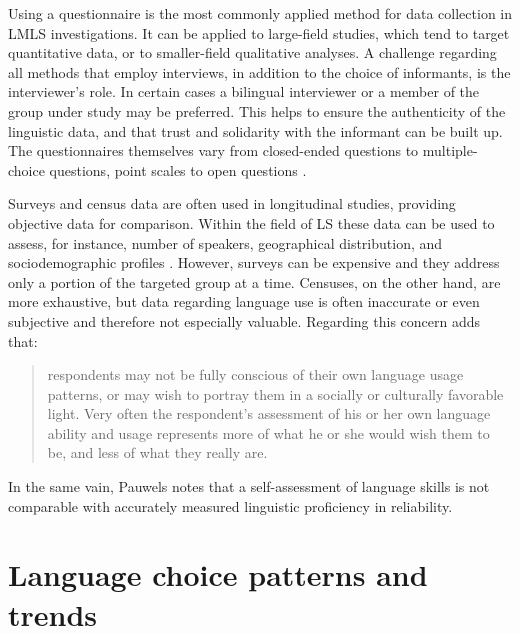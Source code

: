 \documentclass[output=paper,
modfonts
]{langscibook}
\begin{document}
Using a questionnaire is the most commonly applied method for data collection in LMLS investigations. It can be applied to large-field studies, which tend to target quantitative data, or to smaller-field qualitative analyses. A challenge regarding all methods that employ interviews, in addition to the choice of informants, is the interviewer's role. In certain cases a bilingual interviewer or a member of the group under study may be preferred. This helps to ensure the authenticity of the linguistic data, and that trust and solidarity with the informant can be built up. The questionnaires themselves vary from closed-ended questions to multiple-choice questions, point scales to open questions \parencite[53-61]{Pauwels2016}. 

Surveys and census data are often used in longitudinal studies, providing objective data for comparison. Within the field of LS these data can be used to assess, for instance, number of speakers, geographical distribution, and sociodemographic profiles \parencite{Clyne1991}. However, surveys can be expensive and they address only a portion of the targeted group at a time. Censuses, on the other hand, are more exhaustive, but data regarding language use is often inaccurate or even subjective and therefore not especially valuable. Regarding this concern \cite[para. 16]{Buda1992} adds that:

\begin{quote}
respondents may not be fully conscious of their own language usage patterns, or may wish to portray them in a socially or culturally favorable light. Very often the respondent's assessment of his or her own language ability and usage represents more of what he or she would wish them to be, and less of what they really are.
\end{quote}

In the same vain, Pauwels \parencite*[66]{Pauwels2016} notes that a self-assessment of language skills is not comparable with accurately measured linguistic proficiency in reliability.

\section{Language choice patterns and trends}
\label{patterns}
\end{document}
